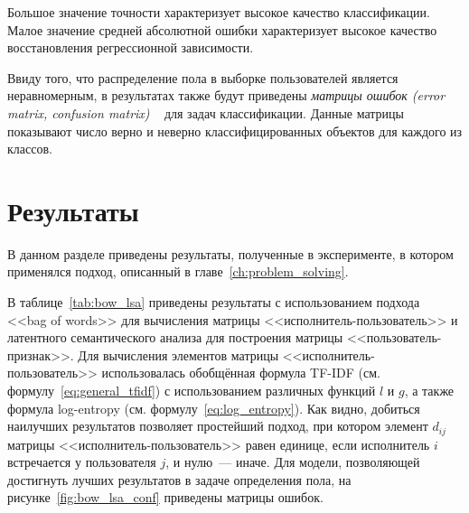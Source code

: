 Большое значение точности характеризует высокое качество классификации.
Малое значение средней абсолютной ошибки характеризует высокое качество
восстановления регрессионной зависимости.

Ввиду того, что распределение пола в выборке пользователей
является неравномерным, в результатах также будут приведены
\textit{матрицы ошибок (error matrix, confusion matrix)
}~\cite{stehman1997selecting} для задач классификации.
Данные матрицы показывают число верно и неверно классифицированных
объектов для каждого из классов.

\section{Результаты}
\label{sec:results}

В данном разделе приведены результаты, полученные в 
эксперименте, в котором применялся подход, описанный в 
главе~\ref{ch:problem_solving}.

В таблице~\ref{tab:bow_lsa}
приведены результаты с использованием подхода <<bag of words>>
для вычисления матрицы <<исполнитель-пользователь>> и латентного
семантического анализа для построения матрицы <<пользователь-признак>>.
Для вычисления элементов матрицы <<исполнитель-пользователь>> использовалась
обобщённая формула TF-IDF (см. формулу~\ref{eq:general_tfidf}) с
использованием различных функций $l$ и $g$, а также формула
log-entropy (см. формулу~\ref{eq:log_entropy}). Как видно,
добиться наилучших результатов позволяет простейший подход,
при котором элемент $d_{ij}$ матрицы <<исполнитель-пользователь>>
равен единице, если исполнитель $i$ встречается у пользователя $j$,
и нулю~--- иначе. Для модели, позволяющей достигнуть лучших
результатов в задаче определения пола,
на рисунке~\ref{fig:bow_lsa_conf} приведены матрицы ошибок.

